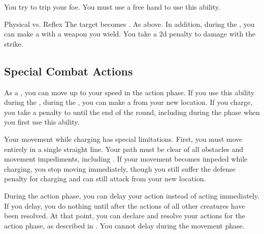             \label{Trip} You try to trip your foe.
            You must use a free hand to use this ability.
            \begin{ability}
                \begin{spelltargetinginfo}
                \end{spelltargetinginfo}
                \begin{spelleffects}
                    \begin{spellattack}{Physical vs. Reflex}
                        \spellsuccess The target becomes \prone.
                        \spellcritical As above. In addition, during the , you can make a  with a weapon you wield.
                        You take a \minus2d penalty to damage with the strike.
                    \end{spellattack}
                \end{spelleffects}
            \end{ability}

    \subsection{Special Combat Actions}

        \label{Charge} As a , you can move up to your speed in the action phase.
        If you use this ability during the , during the , you can make a  from your new location.
        If you charge, you take a  penalty to  until the end of the round, including during the phase when you first use this ability.

        \par Your movement while charging has special limitations.
        First, you must move entirely in a single straight line.
        Your path must be clear of all obstacles and movement impediments, including .
        If your movement becomes impeded while charging, you stop moving immediately, though you still suffer the defense penalty for charging and can still attack from your new location.

        \label{Delay}
        During the action phase, you can delay your action instead of acting immediately.
        If you delay, you do nothing until after the actions of all other creatures have been resolved.
        At that point, you can declare and resolve your actions for the action phase, as described in .
        You cannot delay during the movement phase.

